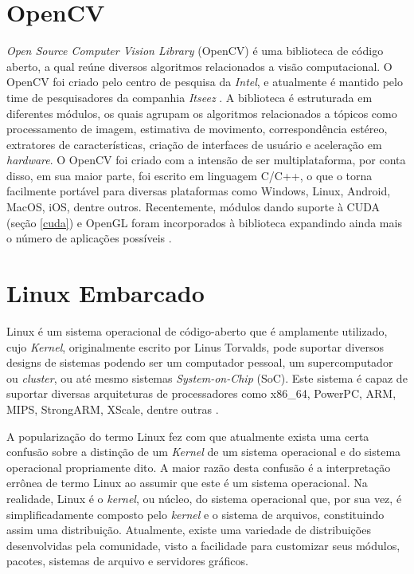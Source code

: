 \section{OpenCV}
\textit{Open Source Computer Vision Library} (OpenCV) é uma biblioteca de código aberto, a qual reúne diversos algoritmos relacionados a visão computacional. O OpenCV foi criado pelo centro de pesquisa da \textit{Intel}, e atualmente é mantido pelo time de pesquisadores da companhia \textit{Itseez} \cite{ItseezOpenCVinfo}. A biblioteca é estruturada em diferentes módulos, os quais agrupam os algoritmos relacionados a tópicos como processamento de imagem, estimativa de movimento, correspondência estéreo, extratores de características, criação de interfaces de usuário e aceleração em \textit{hardware}. O OpenCV foi criado com a intensão de ser multiplataforma, por conta disso, em sua maior parte, foi escrito em linguagem C/C++, o que o torna facilmente portável para diversas plataformas como Windows, Linux, Android, MacOS, iOS, dentre outros. Recentemente, módulos dando suporte à CUDA (seção \ref{cuda}) e OpenGL foram incorporados à biblioteca expandindo ainda mais o número de aplicações possíveis \cite{ItseezOpenCVPlatforms}. 


\section{Linux Embarcado}

Linux é um sistema operacional de código-aberto que é amplamente utilizado, cujo \textit{Kernel}, originalmente escrito por Linus Torvalds, pode suportar diversos designs de sistemas podendo ser um computador pessoal, um supercomputador ou \textit{cluster}, ou até mesmo sistemas \textit{System-on-Chip} (SoC). Este sistema é capaz de suportar diversas arquiteturas de processadores como x86{\_}64, PowerPC, ARM, MIPS, StrongARM, XScale, dentre outras \cite{Wang2011}.

A popularização do termo Linux fez com que atualmente exista uma certa confusão sobre a distinção de um \textit{Kernel} de um sistema operacional e do sistema operacional propriamente dito. A maior razão desta confusão é a interpretação errônea de termo Linux ao assumir que este é um sistema operacional. Na realidade, Linux é o \textit{kernel}, ou núcleo, do sistema operacional que, por sua vez, é simplificadamente composto pelo \textit{kernel} e o sistema de arquivos, constituindo assim uma distribuição. Atualmente, existe uma variedade de distribuições desenvolvidas pela comunidade, visto a facilidade para customizar seus módulos, pacotes, sistemas de arquivo e servidores gráficos. 

